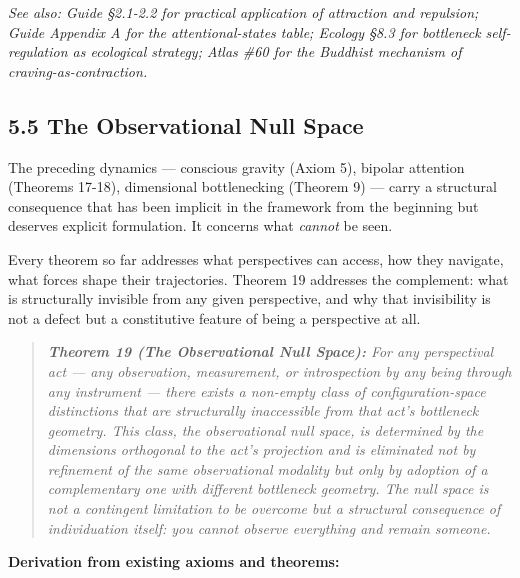 \textit{See also: Guide §2.1-2.2 for practical application of attraction and repulsion; Guide Appendix A for the attentional-states table; Ecology §8.3 for bottleneck self-regulation as ecological strategy; Atlas \#60 for the Buddhist mechanism of craving-as-contraction.}


\subsection*{5.5 The Observational Null Space}


The preceding dynamics — conscious gravity (Axiom 5), bipolar attention (Theorems 17-18), dimensional bottlenecking (Theorem 9) — carry a structural consequence that has been implicit in the framework from the beginning but deserves explicit formulation. It concerns what \textit{cannot} be seen.


Every theorem so far addresses what perspectives can access, how they navigate, what forces shape their trajectories. Theorem 19 addresses the complement: what is structurally invisible from any given perspective, and why that invisibility is not a defect but a constitutive feature of being a perspective at all.


\begin{quote}
\itshape
\textbf{Theorem 19 (The Observational Null Space):} \textit{For any perspectival act — any observation, measurement, or introspection by any being through any instrument — there exists a non-empty class of configuration-space distinctions that are structurally inaccessible from that act's bottleneck geometry. This class, the observational null space, is determined by the dimensions orthogonal to the act's projection and is eliminated not by refinement of the same observational modality but only by adoption of a complementary one with different bottleneck geometry. The null space is not a contingent limitation to be overcome but a structural consequence of individuation itself: you cannot observe everything and remain someone.}
\end{quote}


\textbf{Derivation from existing axioms and theorems:}


